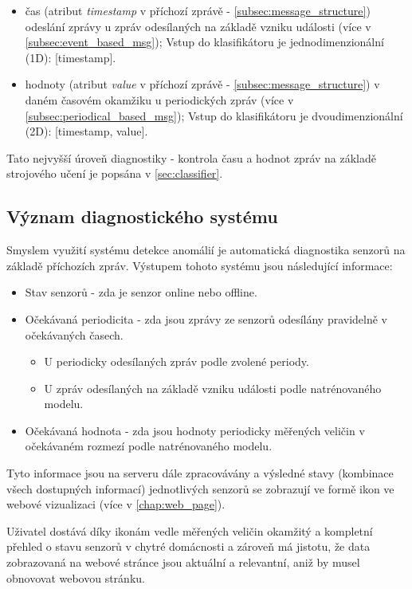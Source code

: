 \begin{itemize}
	\item čas (atribut \textit{timestamp} v příchozí zprávě - \cref{subsec:message_structure}) odeslání zprávy u zpráv odesílaných na základě vzniku události (více v \cref{subsec:event_based_msg}); Vstup do klasifikátoru je jednodimenzionální (1D): [timestamp].
	\item hodnoty (atribut \textit{value} v příchozí zprávě - \cref{subsec:message_structure}) v daném časovém okamžiku u periodických zpráv (více v \cref{subsec:periodical_based_msg}); Vstup do klasifikátoru je dvoudimenzionální (2D): [timestamp, value].
\end{itemize}

Tato nejvyšší úroveň diagnostiky - kontrola času a hodnot zpráv na základě strojového učení je popsána v \cref{sec:classifier}. 

\subsection*{Význam diagnostického systému}
Smyslem využití systému detekce anomálií je automatická diagnostika senzorů na základě příchozích zpráv. Výstupem tohoto systému jsou následující informace:

\begin{itemize}
 	\item Stav senzorů - zda je senzor online nebo offline. 
	\item Očekávaná periodicita - zda jsou zprávy ze senzorů odesílány pravidelně v očekávaných časech.
	\begin{itemize}
		\item U periodicky odesílaných zpráv podle zvolené periody.
		\item U zpráv odesílaných na základě vzniku události podle natrénovaného modelu.
	\end{itemize}
	\item Očekávaná hodnota - zda jsou hodnoty periodicky měřených veličin v očekávaném rozmezí podle natrénovaného modelu.
\end{itemize}

Tyto informace jsou na serveru dále zpracovávány a výsledné stavy (kombinace všech dostupných informací) jednotlivých senzorů se zobrazují ve formě ikon ve webové vizualizaci (více v \cref{chap:web_page}). \par
Uživatel dostává díky ikonám vedle měřených veličin okamžitý a kompletní přehled o stavu senzorů v chytré domácnosti a zároveň má jistotu, že data zobrazovaná na webové stránce jsou aktuální a relevantní, aniž by musel obnovovat webovou stránku.

